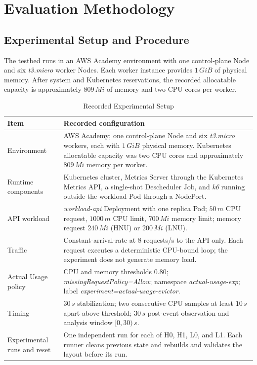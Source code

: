 \section{Evaluation Methodology}
\label{sec:evaluation}

\subsection{Experimental Setup and Procedure}

The testbed runs in an AWS Academy environment with one control-plane Node and
six \textit{t3.micro} worker Nodes. Each worker instance provides \(1\,GiB\) of
physical memory. After system and Kubernetes reservations, the recorded
allocatable capacity is approximately \(809\,Mi\) of memory and two CPU cores
per worker.

\begin{table}[t]
    \centering
    \caption{Recorded Experimental Setup}
    \label{tab:experimental_setup}
    \small
    \renewcommand{\arraystretch}{1.15}
    \begin{tabular}{@{}>{\raggedright\arraybackslash}p{3.1cm}
        >{\raggedright\arraybackslash}p{12.4cm}@{}}
        \toprule
        \textbf{Item} & \textbf{Recorded configuration} \\
        \midrule
        Environment & AWS Academy; one control-plane Node and six
        \textit{t3.micro} workers, each with \(1\,GiB\) physical memory.
        Kubernetes allocatable capacity was two CPU cores and approximately
        \(809\,Mi\) memory per worker. \\
        Runtime components & Kubernetes cluster, Metrics Server through the
        Kubernetes Metrics API, a single-shot Descheduler Job, and
        \textit{k6} running outside the workload Pod through a NodePort. \\
        API workload & \textit{workload-api} Deployment with one replica Pod;
        \(50\,m\) CPU request, \(1000\,m\) CPU limit, \(700\,Mi\) memory limit;
        memory request \(240\,Mi\) (HNU) or \(200\,Mi\) (LNU). \\
        Traffic & Constant-arrival-rate at \(8\) requests/s to the API only.
        Each request executes a deterministic CPU-bound loop; the experiment
        does not generate memory load. \\
        Actual Usage policy & CPU and memory thresholds \(0.80\);
        \textit{missingRequestPolicy=Allow}; namespace
        \textit{actual-usage-exp}; label
        \textit{experiment=actual-usage-evictor}. \\
        Timing & \(30\,s\) stabilization; two consecutive CPU samples at least
        \(10\,s\) apart above threshold; \(30\,s\) post-event observation and
        analysis window \([0,30)\,s\). \\
        Experimental runs and reset & One independent run for each of H0, H1, L0,
        and L1. Each runner cleans previous state and rebuilds and validates
        the layout before its run. \\
        \bottomrule
    \end{tabular}
\end{table}

